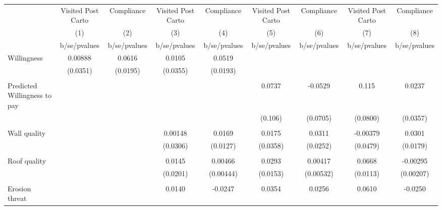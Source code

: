 {
\def\sym#1{\ifmmode^{#1}\else\(^{#1}\)\fi}
\begin{tabular}{l*{8}{c}}
\toprule
                &\multicolumn{1}{c}{Visited Post Carto}&\multicolumn{1}{c}{Compliance}&\multicolumn{1}{c}{Visited Post Carto}&\multicolumn{1}{c}{Compliance}&\multicolumn{1}{c}{Visited Post Carto}&\multicolumn{1}{c}{Compliance}&\multicolumn{1}{c}{Visited Post Carto}&\multicolumn{1}{c}{Compliance}\\
                &\multicolumn{1}{c}{(1)}&\multicolumn{1}{c}{(2)}&\multicolumn{1}{c}{(3)}&\multicolumn{1}{c}{(4)}&\multicolumn{1}{c}{(5)}&\multicolumn{1}{c}{(6)}&\multicolumn{1}{c}{(7)}&\multicolumn{1}{c}{(8)}\\
                &b/se/pvalues&b/se/pvalues&b/se/pvalues&b/se/pvalues&b/se/pvalues&b/se/pvalues&b/se/pvalues&b/se/pvalues\\
\midrule
Willingness     &  0.00888&   0.0616&   0.0105&   0.0519&         &         &         &         \\
                & (0.0351)& (0.0195)& (0.0355)& (0.0193)&         &         &         &         \\
                &         &         &         &         &         &         &         &         \\
Predicted Willingness to pay&         &         &         &         &   0.0737&  -0.0529&    0.115&   0.0237\\
                &         &         &         &         &  (0.106)& (0.0705)& (0.0800)& (0.0357)\\
                &         &         &         &         &         &         &         &         \\
Wall quality    &         &         &  0.00148&   0.0169&   0.0175&   0.0311& -0.00379&   0.0301\\
                &         &         & (0.0306)& (0.0127)& (0.0358)& (0.0252)& (0.0479)& (0.0179)\\
                &         &         &         &         &         &         &         &         \\
Roof quality    &         &         &   0.0145&  0.00466&   0.0293&  0.00417&   0.0668& -0.00295\\
                &         &         & (0.0201)&(0.00444)& (0.0153)&(0.00532)& (0.0113)&(0.00207)\\
                &         &         &         &         &         &         &         &         \\
Erosion threat  &         &         &   0.0140&  -0.0247&   0.0354&   0.0256&   0.0610&  -0.0250\\

\end{tabular}}
